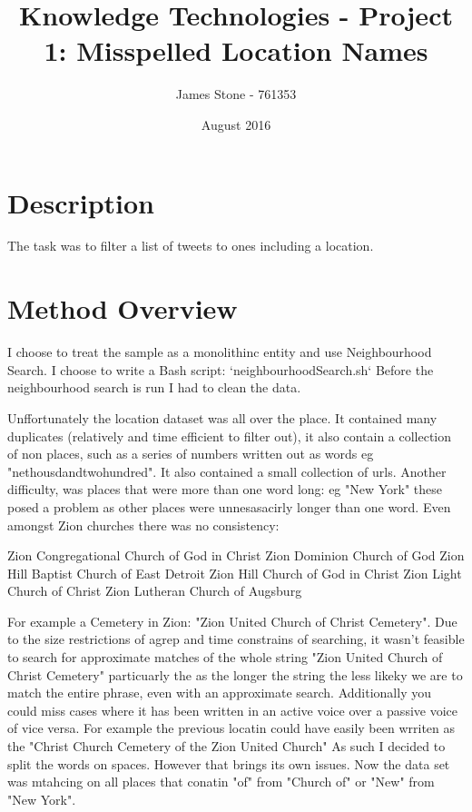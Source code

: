 \documentclass[a4paper]{article}
\title{Knowledge Technologies - Project 1: Misspelled Location Names}
\author{James Stone - 761353}
\date{August 2016}
\begin{document}
\maketitle

\section{Description}
The task was to filter a list of tweets to ones including a location.
\section{Method Overview}
I choose to treat the sample as a monolithinc entity and use Neighbourhood Search.
I choose to write a Bash script:  `neighbourhoodSearch.sh`
Before the neighbourhood search is run I had to clean the data.


Unffortunately the location dataset was all over the place. It contained many duplicates (relatively and time efficient to filter out), it also contain a collection of non places, such as a series of numbers written out as words  eg "nethousdandtwohundred". It also contained a small collection of urls.
Another difficulty, was places that were more than one word long: eg "New York" these posed a problem as other places were unnesasacirly longer than one word. Even amongst Zion churches there was no consistency:

Zion Congregational Church of God in Christ
Zion Dominion Church of God
Zion Hill Baptist Church of East Detroit
Zion Hill Church of God in Christ
Zion Light Church of Christ
Zion Lutheran Church of Augsburg


For example a Cemetery in Zion: "Zion United Church of Christ Cemetery". Due to the size restrictions of agrep and time constrains of searching, it wasn't feasible to search for approximate matches of the whole string "Zion United Church of Christ Cemetery"  particuarly the as the longer the string the less likeky we are to match the entire phrase, even with an approximate search. Additionally you could miss cases where it has been written in an active voice over a passive voice of vice versa. For example the previous locatin could have easily been wrriten as the "Christ Church Cemetery of the Zion United Church" As such I decided to split the words on spaces. However that brings its own issues. Now the data set was mtahcing on all places that conatin "of" from "Church of" or "New" from "New York". 
\end{document}
